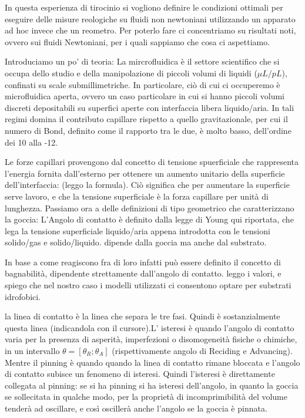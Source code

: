 In questa esperienza di tirocinio si vogliono definire le condizioni ottimali per eseguire delle misure reologiche su fluidi non newtoniani utilizzando un apparato ad hoc invece che un reometro. Per poterlo fare ci concentriamo su risultati noti, ovvero sui fluidi Newtoniani, per i quali sappiamo che cosa ci aspettiamo.

Introduciamo un po' di teoria: La mircrofluidica è il settore scientifico che si occupa dello studio e della manipolazione di piccoli volumi di liquidi ($\mu L/pL$), confinati su scale submillimetriche. In particolare, ciò di cui ci occuperemo è microfluidica aperta, ovvero un caso particolare in cui si hanno piccoli volumi discreti depositabili su superfici aperte con interfaccia libera liquido/aria.
In tali regimi domina il contributo capillare rispetto a quello gravitazionale, per cui il numero di Bond, definito come il rapporto tra le due, è molto basso, dell'ordine dei 10 alla -12.

Le forze capillari provengono dal concetto di tensione spuerficiale che rappresenta l'energia fornita dall'esterno per ottenere un aumento unitario della superficie dell'interfaccia: (leggo la formula). Ciò significa che per aumentare la superficie serve lavoro, e che la tensione superficiale è la forza capillare per unità di lunghezza.
Passiamo ora a delle definizioni di tipo geometrico che caratterizzano la goccia:
L'Angolo di contatto è definito dalla legge di Young qui riportata, che lega la tensione superficiale liquido/aria appena introdotta con le tensioni solido/gas e solido/liquido. dipende dalla goccia ma anche dal substrato.

In base a come reagiscono fra di loro infatti può essere definito il concetto di bagnabilità, dipendente strettamente dall'angolo di contatto.
leggo i valori, e spiego che nel nostro caso i modelli utilizzati ci consentono optare per substrati idrofobici.

la linea di contatto è la linea che separa le tre fasi. Quindi è sostanzialmente questa linea (indicandola con il cursore).L' isteresi è quando l'angolo di contatto varia per la presenza di asperità, imperfezioni o disomogeneità fisiche o chimiche, in un intervallo $\theta=[\theta_R;\theta_A]$ (rispettivamente angolo di Reciding e Advancing). Mentre il pinning è quando quando la linea di contatto rimane bloccata e l'angolo di contatto subisce un fenomeno di isteresi. Quindi l'isteresi è direttamente collegata al pinning: se si ha pinning si ha isteresi dell'angolo, in quanto la goccia se sollecitata in qualche modo, per la proprietà di incomprimibilità del volume tenderà ad oscillare, e così oscillerà anche l'angolo se la goccia è pinnata.

